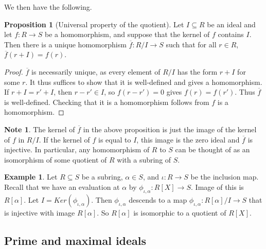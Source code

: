 \documentclass{article}
\newcommand{\rb}[1]{\left( #1 \right)}
\renewcommand{\sb}[1]{\left[ #1 \right]}
\theoremstyle{definition}\newtheorem{definition}{Definition}[subsection]
\theoremstyle{definition}\newtheorem{remark}[definition]{Remark}
\theoremstyle{definition}\newtheorem*{example}{Example}
\theoremstyle{definition}\newtheorem*{note}{Note}
\newtheorem{proposition}[definition]{Proposition}
\begin{document}
We then have the following.

\begin{proposition}[Universal property of the quotient]
Let $ I \subseteq R $ be an ideal and let $ f : R \to S $ be a homomorphism, and suppose that the kernel of $ f $ contains $ I $. Then there is a unique homomorphism $ \overline{f} : R / I \to S $ such that for all $ r \in R $, $ \overline{f}\rb{r + I} = f\rb{r} $.
\end{proposition}

\begin{proof}
$ \overline{f} $ is necessarily unique, as every element of $ R / I $ has the form $ r + I $ for some $ r $. It thus suffices to show that it is well-defined and gives a homomorphism. If $ r + I = r' + I $, then $ r - r' \in I $, so $ f\rb{r - r'} = 0 $ gives $ f\rb{r} = f\rb{r'} $. Thus $ \overline{f} $ is well-defined. Checking that it is a homomorphism follows from $ f $ is a homomorphism.
\end{proof}

\begin{note}
The kernel of $ \overline{f} $ in the above proposition is just the image of the kernel of $ f $ in $ R / I $. If the kernel of $ f $ is equal to $ I $, this image is the zero ideal and $ \overline{f} $ is injective. In particular, any homomorphism of $ R $ to $ S $ can be thought of as an isomorphism of some quotient of $ R $ with a subring of $ S $.
\end{note}

\begin{example}
Let $ R \subseteq S $ be a subring, $ \alpha \in S $, and $ \iota : R \to S $ be the inclusion map. Recall that we have an evaluation at $ \alpha $ by $ \phi_{\iota, \alpha} : R\sb{X} \to S $. Image of this is $ R\sb{\alpha} $. Let $ I = Ker\rb{\phi_{\iota, \alpha}} $. Then $ \phi_{\iota, \alpha} $ descends to a map $ \phi_{\iota, \alpha} : R\sb{\alpha} / I \to S $ that is injective with image $ R\sb{\alpha} $. So $ R\sb{\alpha} $ is isomorphic to a quotient of $ R\sb{X} $.
\end{example}


\subsection{Prime and maximal ideals}
\end{document}
